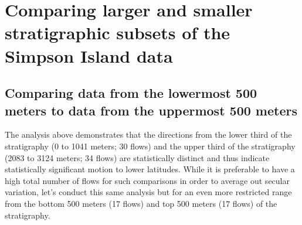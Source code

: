 \documentclass[letterpaper,10pt,english]{/Users/polarwander/Library/Enthought/Canopy_64bit/User/lib/python2.7/site-packages/sphinx/texinputs/sphinxhowto}
\begin{document}
        
    
\section{Comparing larger and smaller stratigraphic subsets of the Simpson Island
data}\subsection{Comparing data from the lowermost 500 meters to data from the uppermost
500 meters}The analysis above demonstrates that the directions from the lower third
of the stratigraphy (0 to 1041 meters; 30 flows) and the upper third of
the stratigraphy (2083 to 3124 meters; 34 flows) are statistically
distinct and thus indicate statistically significant motion to lower
latitudes. While it is preferable to have a high total number of flows
for such comparisons in order to average out secular variation, let's
conduct this same analysis but for an even more restricted range from
the bottom 500 meters (17 flows) and top 500 meters (17 flows) of the
stratigraphy.

\end{document}
